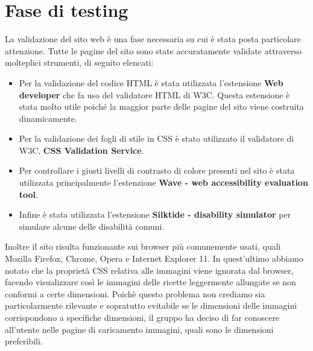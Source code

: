 \section{Fase di testing}\label{sec:fase_di_testing}
La validazione del sito web è una fase necessaria su cui è stata posta particolare attenzione. Tutte le pagine del sito sono state accuratamente validate attraverso molteplici strumenti, di seguito elencati:
\begin{itemize}
    \item Per la validazione del codice HTML è stata utilizzata l'estensione \textbf{Web developer} che fa uso del validatore HTML di W3C. Questa estensione è stata molto utile poiché la maggior parte delle pagine del sito viene costruita dinamicamente.
    \item Per la validazione dei fogli di stile in CSS è stato utilizzato il validatore di W3C, \textbf{CSS Validation Service}.
    \item Per controllare i giusti livelli di contrasto di colore presenti nel sito è stata utilizzata principalmente l'estenzione \textbf{Wave - web accessibility evaluation tool}.
    \item Infine è stata utilizzata l'estensione \textbf{Silktide - disability simulator} per simulare alcune delle disabilità comuni.
\end{itemize}
Inoltre il sito risulta funzionante sui browser più comunemente usati, quali Mozilla Firefox, Chrome, Opera e Internet Explorer 11. In quest'ultimo abbiamo notato che la proprietà CSS  relativa alle immagini viene ignorata dal browser, facendo visualizzare così le immagini delle ricette leggermente allungate se non conformi a certe dimensioni. Poichè questo problema non crediamo sia particolarmente rilevante e sopratutto evitabile se le dimensioni delle immagini corrispondono a specifiche dimensioni, il gruppo ha deciso di far conoscere all'utente nelle pagine di caricamento immagini, quali sono le dimensioni preferibili.
